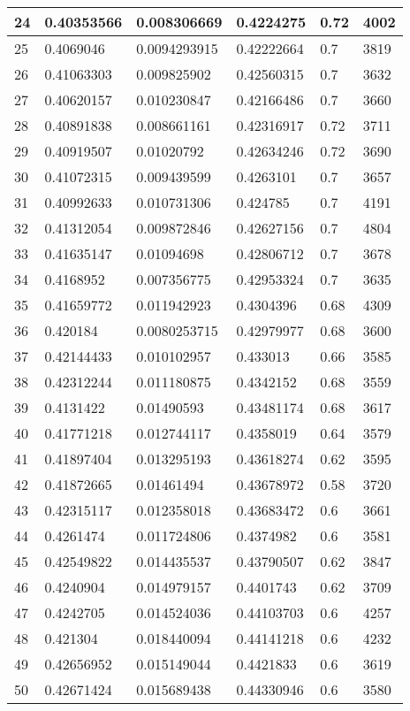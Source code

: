 \begin{longtable}{|l|l|l|l|l|l|}
24 & 0.40353566 & 0.008306669 & 0.4224275 & 0.72 & 4002 \\ \hline 
25 & 0.4069046 & 0.0094293915 & 0.42222664 & 0.7 & 3819 \\ \hline 
26 & 0.41063303 & 0.009825902 & 0.42560315 & 0.7 & 3632 \\ \hline 
27 & 0.40620157 & 0.010230847 & 0.42166486 & 0.7 & 3660 \\ \hline 
28 & 0.40891838 & 0.008661161 & 0.42316917 & 0.72 & 3711 \\ \hline 
29 & 0.40919507 & 0.01020792 & 0.42634246 & 0.72 & 3690 \\ \hline 
30 & 0.41072315 & 0.009439599 & 0.4263101 & 0.7 & 3657 \\ \hline 
31 & 0.40992633 & 0.010731306 & 0.424785 & 0.7 & 4191 \\ \hline 
32 & 0.41312054 & 0.009872846 & 0.42627156 & 0.7 & 4804 \\ \hline 
33 & 0.41635147 & 0.01094698 & 0.42806712 & 0.7 & 3678 \\ \hline 
34 & 0.4168952 & 0.007356775 & 0.42953324 & 0.7 & 3635 \\ \hline 
35 & 0.41659772 & 0.011942923 & 0.4304396 & 0.68 & 4309 \\ \hline 
36 & 0.420184 & 0.0080253715 & 0.42979977 & 0.68 & 3600 \\ \hline 
37 & 0.42144433 & 0.010102957 & 0.433013 & 0.66 & 3585 \\ \hline 
38 & 0.42312244 & 0.011180875 & 0.4342152 & 0.68 & 3559 \\ \hline 
39 & 0.4131422 & 0.01490593 & 0.43481174 & 0.68 & 3617 \\ \hline 
40 & 0.41771218 & 0.012744117 & 0.4358019 & 0.64 & 3579 \\ \hline 
41 & 0.41897404 & 0.013295193 & 0.43618274 & 0.62 & 3595 \\ \hline 
42 & 0.41872665 & 0.01461494 & 0.43678972 & 0.58 & 3720 \\ \hline 
43 & 0.42315117 & 0.012358018 & 0.43683472 & 0.6 & 3661 \\ \hline 
44 & 0.4261474 & 0.011724806 & 0.4374982 & 0.6 & 3581 \\ \hline 
45 & 0.42549822 & 0.014435537 & 0.43790507 & 0.62 & 3847 \\ \hline 
46 & 0.4240904 & 0.014979157 & 0.4401743 & 0.62 & 3709 \\ \hline 
47 & 0.4242705 & 0.014524036 & 0.44103703 & 0.6 & 4257 \\ \hline 
48 & 0.421304 & 0.018440094 & 0.44141218 & 0.6 & 4232 \\ \hline 
49 & 0.42656952 & 0.015149044 & 0.4421833 & 0.6 & 3619 \\ \hline 
50 & 0.42671424 & 0.015689438 & 0.44330946 & 0.6 & 3580 \\ \hline 
\end{longtable}